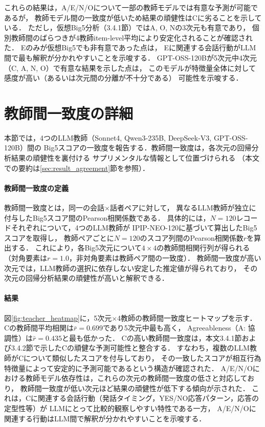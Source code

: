 \documentclass[dvipdfmx,11pt,a4paper]{bxjsarticle}
\renewcommand{\_}{\paperorigunderscore\allowbreak}%
\begin{document}
これらの結果は，A/E/N/Oについて一部の教師モデルでは有意な予測が可能であるが，
教師モデル間の一致度が低いため結果の頑健性はCに劣ることを示している．
ただし，仮想Big5分析（3.4.1節）ではA, O, Nの3次元も有意であり，
個別教師間のばらつきが4教師item-level平均により安定化されることが確認された．
Eのみが仮想Big5でも非有意であった点は，
Eに関連する会話行動がLLM間で最も解釈が分かれやすいことを示唆する．
GPT-OSS-120Bが5次元中4次元（C, A, N, O）で有意な結果を示した点は，
このモデルが特徴量全体に対して感度が高い（あるいは次元間の分離が不十分である）
可能性を示唆する．

\section{教師間一致度の詳細}
\label{sec:appendix_teacher_agreement}
本節では，4つのLLM教師（Sonnet4, Qwen3-235B, DeepSeek-V3, GPT-OSS-120B）間の
Big5スコアの一致度を報告する．教師間一致度は，各次元の回帰分析結果の頑健性を裏付ける
サプリメンタルな情報として位置づけられる
（本文での要約は\ref{sec:result_agreement}節を参照）．

\paragraph{教師間一致度の定義}
教師間一致度とは，同一の会話$\times$話者ペアに対して，
異なるLLM教師が独立に付与したBig5スコア間のPearson相関係数である．
具体的には，$N = 120$レコードそれぞれについて，4つのLLM教師が
IPIP-NEO-120に基づいて算出したBig5スコアを取得し，
教師ペアごとに$N = 120$のスコア列間のPearson相関係数$r$を算出する．
これにより，各Big5次元について$4 \times 4$の教師間相関行列が得られる
（対角要素は$r = 1.0$，非対角要素は教師ペア間の一致度）．
教師間一致度が高い次元では，LLM教師の選択に依存しない安定した推定値が得られており，
その次元の回帰分析結果の頑健性が高いと解釈できる．

\paragraph{結果}
図\ref{fig:teacher_heatmap}に，5次元$\times$4教師の教師間一致度ヒートマップを示す．
Cの教師間平均相関は$\bar{r} = 0.699$であり5次元中最も高く，
Agreeableness（A: 協調性）は$\bar{r} = 0.435$と最も低かった．
Cの高い教師間一致度は，本文3.4.1節および3.4.2節で示したCの頑健な予測可能性と整合する．
すなわち，複数のLLM教師がCについて類似したスコアを付与しており，
その一致したスコアが相互行為特徴量によって安定的に予測可能であるという構造が確認された．
A/E/N/Oにおける教師モデル依存性は，これらの次元の教師間一致度の低さと対応しており，
教師間一致度が低い次元ほど結果の頑健性が低下する傾向が示された．
これは，Cに関連する会話行動（発話タイミング，YES/NO応答パターン，応答の定型性等）が
LLMにとって比較的観察しやすい特性である一方，
A/E/N/Oに関連する行動はLLM間で解釈が分かれやすいことを示唆する．
\end{document}
